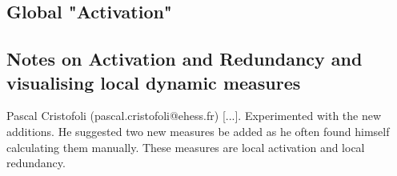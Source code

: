 




\subsection{Global "Activation"}




\subsection{Notes on Activation and Redundancy and visualising local dynamic measures}

Pascal Cristofoli (pascal.cristofoli@ehess.fr) [...]. Experimented with the new additions. He suggested two new measures be added as he often found himself calculating them manually. These measures are local activation and local redundancy.


